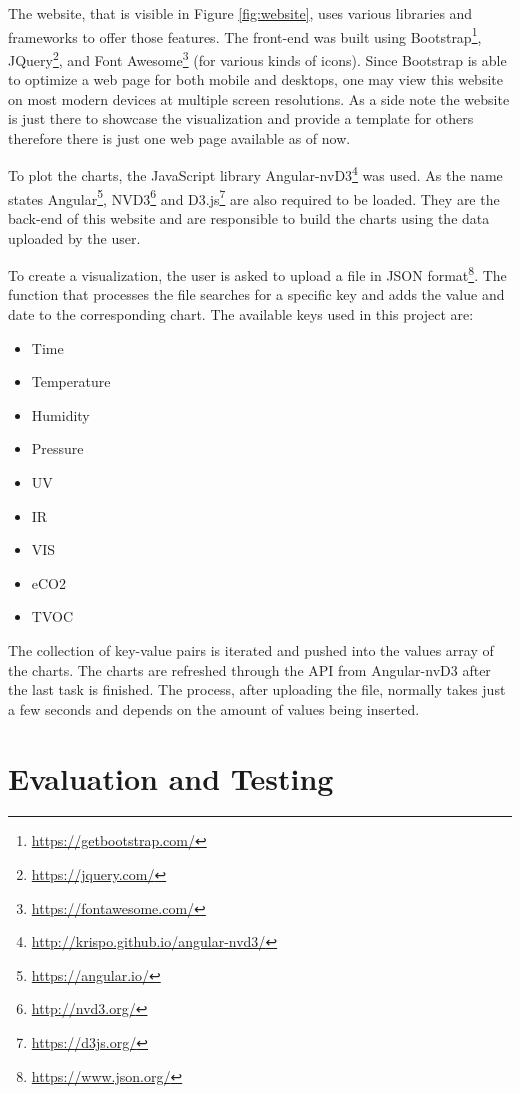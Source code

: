 \documentclass{article}      %
\begin{document}
The website, that is visible in Figure \ref{fig:website}, uses various libraries and frameworks to offer those features. The front-end was built using Bootstrap\footnote{\url{https://getbootstrap.com/}}, JQuery\footnote{\url{https://jquery.com/}}, and Font Awesome\footnote{\url{https://fontawesome.com/}} (for various kinds of icons). Since Bootstrap is able to optimize a web page for both mobile and desktops, one may view this website on most modern devices at multiple screen resolutions. As a side note the website is just there to showcase the visualization and provide a template for others therefore there is just one web page available as of now.

To plot the charts, the JavaScript library Angular-nvD3\footnote{\url{http://krispo.github.io/angular-nvd3/}} was used. As the name states Angular\footnote{\url{https://angular.io/}}, NVD3\footnote{\url{http://nvd3.org/}} and D3.js\footnote{\url{https://d3js.org/}} are also required to be loaded. They are the back-end of this website and are responsible to build the charts using the data uploaded by the user.

To create a visualization, the user is asked to upload a file in \gls{JSON} format\footnote{\url{https://www.json.org/}}. The function that processes the file searches for a specific key and adds the value and date to the corresponding chart. The available keys used in this project are:

\begin{itemize}
  \setlength\itemsep{0em}
  \item Time
  \item Temperature
  \item Humidity
  \item Pressure
  \item UV
  \item IR
  \item VIS
  \item eCO2
  \item TVOC
\end{itemize}

The collection of key-value pairs is iterated and pushed into the values array of the charts. The charts are refreshed through the \gls{API} from Angular-nvD3 after the last task is finished. The process, after uploading the file, normally takes just a few seconds and depends on the amount of values being inserted.

\section{Evaluation	and	Testing} \label{sec:evaluation}
\end{document}

